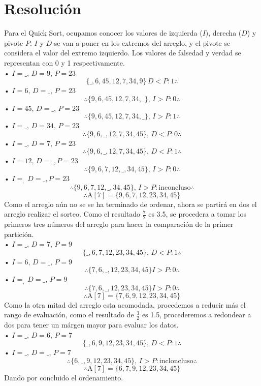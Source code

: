 \documentclass[letterpaper, 12pt]{article}
\begin{document}
    \section{Resolución}
    Para el Quick Sort, ocupamos conocer los valores de izquierda (\(I\)), derecha (\(D\)) y pivote \(P\). \(I\) y \(D\) se van a poner en los extremos del arreglo, y el pivote se considera el valor del extremo izquierdo. Los valores de falsedad y verdad
    se representan con 0 y 1 respectivamente.
    \\• \(I=\_,\, D=9,\, P=23\)
    \[\{\_,6,45,12,7,34,9\}\, D<P:1\therefore\]
    • \(I=6,\, D=\_,\, P=23\)
    \[\therefore \{9,6,45,12,7,34,\_\},\, I>P:0 \therefore\]
    • \(I=45,\, D=\_,\,P=23\)
    \[\therefore \{9,6,45,12,7,34,\_\},\, I>P:1 \therefore\]
    • \(I=\_,\, D=34,\, P=23\)
    \[\therefore \{9,6,\_,12,7,34,45\},\, D<P:0 \therefore\]
    • \(I=\_,\, D=7,\, P=23\)
    \[\therefore \{9,6,\_,12,7,34,45\},\, D<P:1 \therefore\]
    • \(I=12,\, D=\_, P=23\)
    \[\therefore \{9,6,7,12,\_,34,45\},\, I>P:0 \therefore\]
    • \(I=_,\, D=\_, P=23\)
    \[\therefore \{9,6,7,12,\_,34,45\},\, I>P:\text{inconcluso} \therefore\]
    \[\therefore \text{A}[7]=\{9,6,7,12,23,34,45\}\] 
    Como el arreglo aún no se se ha terminado de ordenar, ahora se partirá en dos el arreglo realizar el sorteo. Como el resultado \(\frac{7}{2}\) es 3.5, se procedera a tomar los primeros tres números del arreglo para hacer la comparación de la primer partición.
    \\• \(I=\_,\, D=7,\, P=9\)
    \[\{\_,6,7,12,23,34,45\},\, D<P:1 \therefore\]
    • \(I=6,\, D=\_,\, P=9\)
    \[\therefore \{7,6,\_,12,23,34,45\} I>P:0 \therefore\]
    • \(I=_,\, D=\_,\, P=9\)
    \[\therefore \{7,6,\_,12,23,34,45\} I>P:0 \therefore\]
    \[\therefore \text{A}[7]=\{7,6,9,12,23,34,45\}\]
    Como la otra mitad del arreglo esta acomodada, procedemos a reducir más el rango de evaluación, como el resultado de \(\frac{3}{2}\) es 1.5, procederemos a redondear a dos para tener un márgen mayor para evaluar los datos.
    \\• \(I=\_,\, D=6,\, P=7\)
    \[\{\_,6,9,12,23,34,45\},\, D<P:1 \therefore\]
    • \(I=\_,\, D=\_,\, P=7\)
    \[\therefore\{6,\_,9,12,23,34,45\},\, I>P:\text{incloncluso} \therefore\]
    \[\therefore \text{A}[7]=\{6,7,9,12,23,34,45\}\]
    Dando por concluido el ordenamiento.
\end{document}
